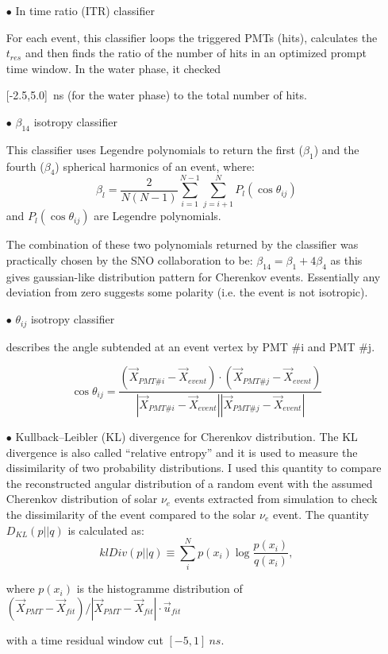 \begin{itemize}

\item[$\bullet$] In time ratio (ITR) classifier

For each event, this classifier loops the triggered PMTs (hits), calculates the $t_{res}$ and then finds the ratio of the number of hits in an optimized prompt time window. In the water phase, it checked 

[-2.5,5.0]~ns (for the water phase) to the total number of hits.


\item[$\bullet$] $\beta_{14}$ isotropy classifier

This classifier uses Legendre polynomials to return the	first ($\beta_1$) and the fourth ($\beta_4$) spherical	harmonics of an event, where:
\[
\beta_l = \frac{2}{N(N-1)}\sum_{i=1}^{N-1}\sum_{j=i+1}^N P_l(\cos\theta_{ij})
\]
and $P_l(\cos\theta_{ij})$ are Legendre polynomials.


The	combination	of these two polynomials returned by the classifier	was	
practically	chosen by the SNO collaboration	to be: $\beta_{14}=\beta_1+4\beta_4$
as this gives gaussian-like	distribution pattern for Cherenkov events.	
Essentially	any	deviation from zero suggests some polarity (i.e. the event is not isotropic).	


\item[$\bullet$] $\theta_{ij}$ isotropy classifier 

describes the angle subtended at an event vertex by PMT \#i and PMT \#j.

\[
\cos\theta_{ij}=\frac{(\vec{X}_{PMT\#i}- \vec{X}_{event})\cdot (\vec{X}_{PMT\#j}- \vec{X}_{event})}{|\vec{X}_{PMT\#i}- \vec{X}_{event}||\vec{X}_{PMT\#j}- \vec{X}_{event}|}
\]


\item[$\bullet$] Kullback–Leibler (KL) divergence for Cherenkov distribution. The KL divergence is also called ``relative entropy'' and it is used to measure the dissimilarity of two probability distributions\cite{murphy2012machine}. I used this quantity to compare the reconstructed angular distribution of a random event with the assumed Cherenkov distribution of solar $\nu_e$ events extracted from simulation to check the dissimilarity of the event compared to the solar $\nu_e$ event. The quantity $D_{KL}(p||q)$ is calculated as: 
\begin{equation}\label{kldiv}
klDiv(p||q) \equiv \sum_{i}^N p(x_i)\log{\frac{p(x_i)}{q(x_i)}},
\end{equation}

where $p(x_i)$ is the histogramme distribution of $(\vec{X}_{PMT}-\vec{X}_{fit})/|\vec{X}_{PMT}-\vec{X}_{fit}|\cdot\vec{u}_{fit}$ 



with a time residual window cut $[-5,1]~ns$.







\end{itemize}





